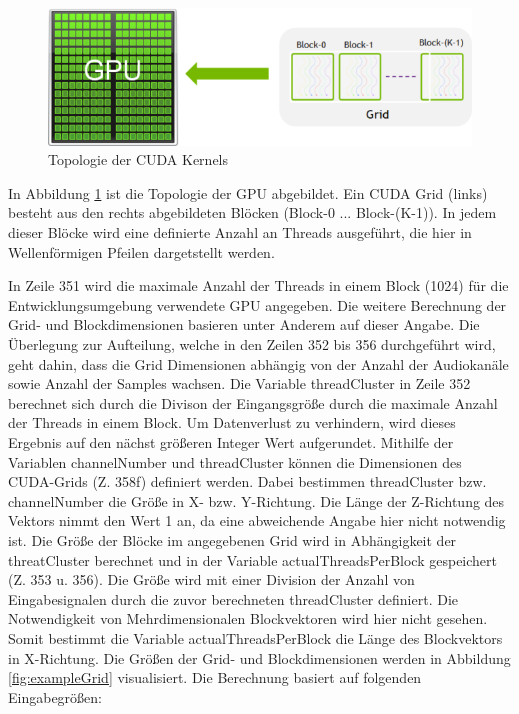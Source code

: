 \begin{figure}[hbt!]
	\centering      
	\includegraphics[scale=0.5]{figures/cudaGrid.png}
	\caption{Topologie der CUDA Kernels \cite{nvidia_docs_grid}}
	\label{fig:cudaGrids}
\end{figure}

In Abbildung \ref{fig:cudaGrids} ist die Topologie der GPU abgebildet. Ein CUDA Grid (links) besteht aus den rechts abgebildeten Blöcken (Block-0 ... Block-(K-1)). In jedem dieser Blöcke wird eine definierte Anzahl an Threads ausgeführt, die hier in Wellenförmigen Pfeilen dargetstellt werden. 

In Zeile 351 wird die maximale Anzahl der Threads in einem Block (1024) für die Entwicklungsumgebung verwendete GPU angegeben. Die weitere Berechnung der Grid- und Blockdimensionen basieren unter Anderem auf dieser Angabe. Die Überlegung zur Aufteilung, welche in den Zeilen 352 bis 356 durchgeführt wird, geht dahin, dass die Grid Dimensionen abhängig von der Anzahl der Audiokanäle sowie Anzahl der Samples wachsen.
Die Variable threadCluster in Zeile 352 berechnet sich durch die Divison der Eingangsgröße durch die maximale Anzahl der Threads in einem Block. Um Datenverlust zu verhindern, wird dieses Ergebnis auf den nächst größeren Integer Wert aufgerundet. Mithilfe der Variablen channelNumber und threadCluster können die Dimensionen des CUDA-Grids (Z. 358f) definiert werden. Dabei bestimmen threadCluster bzw. channelNumber die Größe in X- bzw. Y-Richtung. Die Länge der Z-Richtung des Vektors nimmt den Wert 1 an, da eine abweichende Angabe hier nicht notwendig ist. Die Größe der Blöcke im angegebenen Grid wird in Abhängigkeit der threatCluster berechnet und in der Variable actualThreadsPerBlock gespeichert (Z. 353 u. 356). Die Größe wird mit einer Division der Anzahl von Eingabesignalen durch die zuvor berechneten threadCluster definiert. Die Notwendigkeit von Mehrdimensionalen Blockvektoren wird hier nicht gesehen. Somit bestimmt die Variable actualThreadsPerBlock die Länge des Blockvektors in X-Richtung. Die Größen der Grid- und Blockdimensionen werden in Abbildung  \ref{fig:exampleGrid} visualisiert. Die Berechnung basiert auf folgenden Eingabegrößen:


